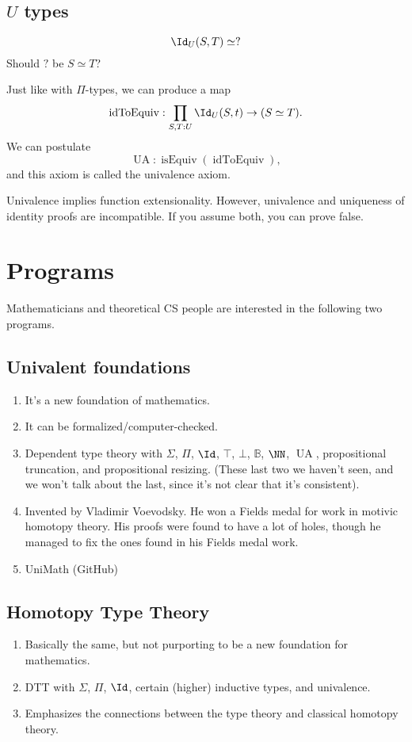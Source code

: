 \documentclass{article}
\newcommand\pred[1]{\operatorname{#1}}
\newcommand\isEquiv{\pred{isEquiv}}
\newcommand\BB{\mathbb{B}}
\begin{document}
\subsection{$U$ types}

\[\Id_{U}(S,T) \simeq ?\]
Should $?$ be $S\simeq T$?

Just like with $\Pi$-types, we can produce a map 
\[ \pred{idToEquiv} : \prod_{S,T:U} \Id_U(S,t) \to (S\simeq T).\]
We can postulate 
\[\pred{UA} : \isEquiv(\pred{idToEquiv}),\]
and this axiom is called the univalence axiom.

Univalence implies function extensionality. 
However, univalence and uniqueness of identity proofs are 
incompatible. If you assume both, you can prove false.

\section{Programs}

Mathematicians and theoretical CS people are interested in 
the following two programs.

\subsection{Univalent foundations}

\begin{enumerate}
\item It's a new foundation of mathematics.
\item It can be formalized/computer-checked.
\item Dependent type theory with $\Sigma$, $\Pi$, $\Id$, $\top$,
$\bot$, $\BB$, $\NN$, $\pred{UA}$, propositional truncation, 
and propositional resizing. (These last two we haven't seen, 
and we won't talk about the last, since it's not clear that 
it's consistent). 
\item Invented by Vladimir Voevodsky. He won a Fields 
medal for work in motivic homotopy theory. His proofs were found 
to have a lot of holes, though he managed to fix the ones found 
in his Fields medal work.
\item UniMath (GitHub)
\end{enumerate}

\subsection{Homotopy Type Theory}

\begin{enumerate}
    \item Basically the same, but not purporting to be a new 
        foundation for mathematics.
    \item DTT with $\Sigma$, $\Pi$, $\Id$, certain (higher)
        inductive types, and univalence.
    \item Emphasizes the connections between the type theory
        and classical homotopy theory.
\end{enumerate}
\end{document}
